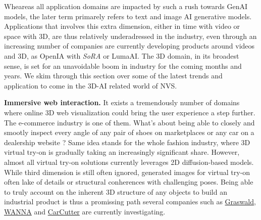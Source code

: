 Wheareas all application domains are impacted by such a rush towards \ac{GenAI} models, the later term primarely refers to text and image \ac{AI} generative models. Applications that involves this extra dimension, either in time with video or space with 3D, are thus relatively underadressed in the industry, even through an increasing number of companies are currently developing products around videos and 3D, as OpenIA with \textit{SoRA} or LumaAI. The 3D domain, in its broadest sense, is set for an unavoidable boom in industry for the coming months and years. We skim through this section over some of the latest trends and application to come in the 3D-\ac{AI} related world of \ac{NVS}. 

\noindent \textbf{Immersive web interaction.} It exists a tremendously number of domains where online 3D web visualization could bring the user experience a step further. The e-commerce industry is one of them. What's about being able to closely and smootly inspect every angle of any pair of shoes on  marketplaces or any car on a dealership website ? Same idea stands for the whole fashion industry, where 3D virtual try-on is gradually taking an increasingly significant share. However, almost all virtual try-on solutions currently leverages 2D diffusion-based models. While third dimension is still often ignored, generated images for virtual try-on often lake of details or structural conherences with challenging poses. Being able to truly account on the inherent 3D structure of any objects to build an industrial product is thus a promissing path several companies such as \href{https://www.graswald.ai/}{Graswald}, \href{https://wanna.fashion/}{WANNA} and \href{https://www.car-cutter.com/}{CarCutter} are currently investigating. 

